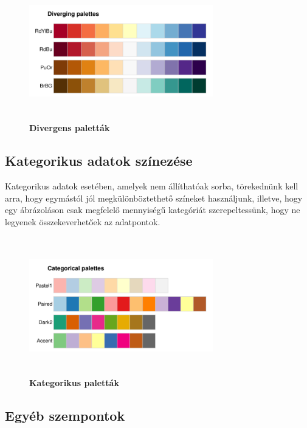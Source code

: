 \documentclass[12pt]{article}
\theoremstyle{plain}
\begin{document}
  \begin{figure}[H]
    \centering
    \includegraphics[width=8cm, height=6cm]{media/diverging.png}
    \caption{\textbf{Divergens paletták}}
    \label{fig:GeneralDiagram}
 \end{figure}
 
 \subsection{Kategorikus adatok színezése}
 Kategorikus adatok esetében, amelyek nem állíthatóak sorba, törekednünk kell arra, hogy egymástól jól megkülönböztethető színeket használjunk, illetve, hogy egy ábrázoláson csak megfelelő mennyiségű kategóriát szerepeltessünk, hogy ne legyenek összekeverhetőek az adatpontok.
 
 
 
 \begin{figure}[H]
    \centering
    \includegraphics[width=8cm, height=6cm]{media/categorical.png}
    \caption{\textbf{Kategorikus paletták}}
    \label{fig:GeneralDiagram}
 \end{figure}
 
 \subsection{Egyéb szempontok}
 
\end{document}
